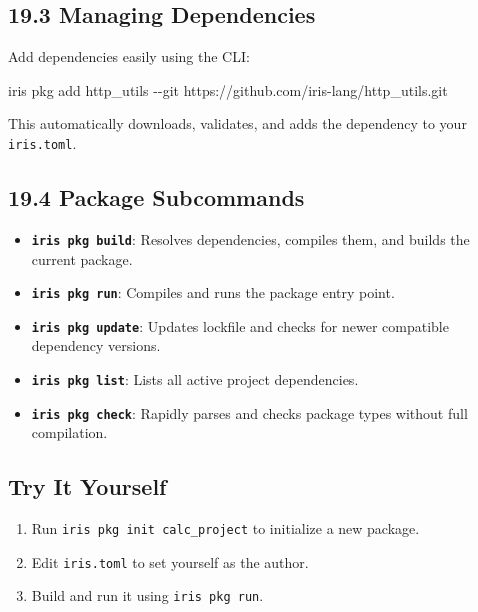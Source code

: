 \documentclass[
  english,
]{book}
\newenvironment{Shaded}{\begin{snugshade}}{\end{snugshade}}
\newcommand{\AttributeTok}[1]{\textcolor[rgb]{0.83,0.83,0.83}{#1}}
\newcommand{\ExtensionTok}[1]{\textcolor[rgb]{0.83,0.83,0.83}{#1}}
\newcommand{\NormalTok}[1]{\textcolor[rgb]{0.83,0.83,0.83}{#1}}
\providecommand{\tightlist}{%
  \setlength{\itemsep}{0pt}\setlength{\parskip}{0pt}}
\begin{document}
\subsection{19.3 Managing Dependencies}\label{managing-dependencies-1}

Add dependencies easily using the CLI:

\begin{Shaded}
\begin{Highlighting}[]
\ExtensionTok{iris}\NormalTok{ pkg add http\_utils }\AttributeTok{{-}{-}git}\NormalTok{ https://github.com/iris{-}lang/http\_utils.git}
\end{Highlighting}
\end{Shaded}

This automatically downloads, validates, and adds the dependency to your
\texttt{iris.toml}.

\subsection{19.4 Package Subcommands}\label{package-subcommands-1}

\begin{itemize}
\tightlist
\item
  \textbf{\texttt{iris\ pkg\ build}}: Resolves dependencies, compiles
  them, and builds the current package.
\item
  \textbf{\texttt{iris\ pkg\ run}}: Compiles and runs the package entry
  point.
\item
  \textbf{\texttt{iris\ pkg\ update}}: Updates lockfile and checks for
  newer compatible dependency versions.
\item
  \textbf{\texttt{iris\ pkg\ list}}: Lists all active project
  dependencies.
\item
  \textbf{\texttt{iris\ pkg\ check}}: Rapidly parses and checks package
  types without full compilation.
\end{itemize}

\subsection{Try It Yourself}\label{try-it-yourself-18}

\begin{enumerate}
\def\labelenumi{\arabic{enumi}.}
\tightlist
\item
  Run \texttt{iris\ pkg\ init\ calc\_project} to initialize a new
  package.
\item
  Edit \texttt{iris.toml} to set yourself as the author.
\item
  Build and run it using \texttt{iris\ pkg\ run}.
\end{enumerate}
\end{document}

